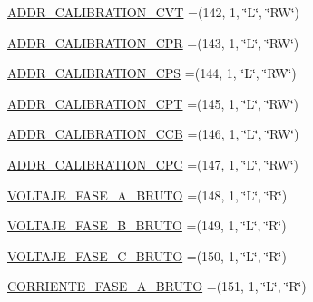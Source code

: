 \begin{DoxyCompactItemize}
\item 
\hyperlink{enumcom_1_1eneri_1_1scorpio__metertool_1_1devices_1_1_register_a01019cb7ec5053e7dcf178ad36f552b3}{A\+D\+D\+R\+\_\+\+C\+A\+L\+I\+B\+R\+A\+T\+I\+O\+N\+\_\+\+C\+VT} =(142, 1, \char`\"{}L\char`\"{}, \char`\"{}RW\char`\"{})
\item 
\hyperlink{enumcom_1_1eneri_1_1scorpio__metertool_1_1devices_1_1_register_ae1ee929a2e857aa9ce847df1a87528e0}{A\+D\+D\+R\+\_\+\+C\+A\+L\+I\+B\+R\+A\+T\+I\+O\+N\+\_\+\+C\+PR} =(143, 1, \char`\"{}L\char`\"{}, \char`\"{}RW\char`\"{})
\item 
\hyperlink{enumcom_1_1eneri_1_1scorpio__metertool_1_1devices_1_1_register_a4338765ef25b4809c64a54a2bec4da72}{A\+D\+D\+R\+\_\+\+C\+A\+L\+I\+B\+R\+A\+T\+I\+O\+N\+\_\+\+C\+PS} =(144, 1, \char`\"{}L\char`\"{}, \char`\"{}RW\char`\"{})
\item 
\hyperlink{enumcom_1_1eneri_1_1scorpio__metertool_1_1devices_1_1_register_a608974a6ecee7e8eed7a299edaf82762}{A\+D\+D\+R\+\_\+\+C\+A\+L\+I\+B\+R\+A\+T\+I\+O\+N\+\_\+\+C\+PT} =(145, 1, \char`\"{}L\char`\"{}, \char`\"{}RW\char`\"{})
\item 
\hyperlink{enumcom_1_1eneri_1_1scorpio__metertool_1_1devices_1_1_register_a3c9b4df7de4fdf862c4caf8ceabcfe17}{A\+D\+D\+R\+\_\+\+C\+A\+L\+I\+B\+R\+A\+T\+I\+O\+N\+\_\+\+C\+CB} =(146, 1, \char`\"{}L\char`\"{}, \char`\"{}RW\char`\"{})
\item 
\hyperlink{enumcom_1_1eneri_1_1scorpio__metertool_1_1devices_1_1_register_a38b535dcf5dd332e4a26639261ab7593}{A\+D\+D\+R\+\_\+\+C\+A\+L\+I\+B\+R\+A\+T\+I\+O\+N\+\_\+\+C\+PC} =(147, 1, \char`\"{}L\char`\"{}, \char`\"{}RW\char`\"{})
\item 
\hyperlink{enumcom_1_1eneri_1_1scorpio__metertool_1_1devices_1_1_register_ac67d9ca07498fbbc5f318dd6045742da}{V\+O\+L\+T\+A\+J\+E\+\_\+\+F\+A\+S\+E\+\_\+\+A\+\_\+\+B\+R\+U\+TO} =(148, 1, \char`\"{}L\char`\"{}, \char`\"{}R\char`\"{})
\item 
\hyperlink{enumcom_1_1eneri_1_1scorpio__metertool_1_1devices_1_1_register_a0a5026b2256062e96998b04db3a3592a}{V\+O\+L\+T\+A\+J\+E\+\_\+\+F\+A\+S\+E\+\_\+\+B\+\_\+\+B\+R\+U\+TO} =(149, 1, \char`\"{}L\char`\"{}, \char`\"{}R\char`\"{})
\item 
\hyperlink{enumcom_1_1eneri_1_1scorpio__metertool_1_1devices_1_1_register_a63ec189a8ae18472bebadbcd59619009}{V\+O\+L\+T\+A\+J\+E\+\_\+\+F\+A\+S\+E\+\_\+\+C\+\_\+\+B\+R\+U\+TO} =(150, 1, \char`\"{}L\char`\"{}, \char`\"{}R\char`\"{})
\item 
\hyperlink{enumcom_1_1eneri_1_1scorpio__metertool_1_1devices_1_1_register_a3bc088d6700bcecc803ced86a68c5359}{C\+O\+R\+R\+I\+E\+N\+T\+E\+\_\+\+F\+A\+S\+E\+\_\+\+A\+\_\+\+B\+R\+U\+TO} =(151, 1, \char`\"{}L\char`\"{}, \char`\"{}R\char`\"{})

\end{DoxyCompactItemize}
